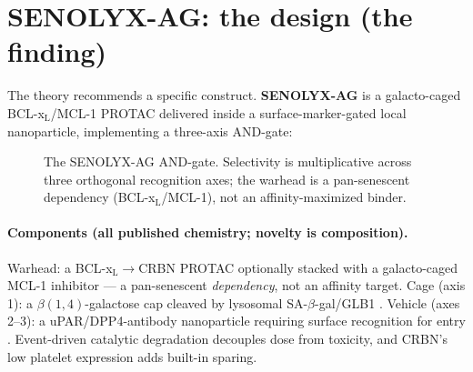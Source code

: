 \documentclass[11pt,a4paper]{article}
\newcommand{\tierdisc}[1]{\textcolor{#1}{\rule[0.05ex]{1.0ex}{1.0ex}}}
\newcommand{\tierGreen}{\tierdisc{green!60!black}}
\newcommand{\tierRed}{\tierdisc{red!80!black}}
\begin{document}
\section{SENOLYX-AG: the design (the finding)}
\label{sec:design}

The theory recommends a specific construct. \textbf{SENOLYX-AG} is a
galacto-caged BCL-x$_{\mathrm L}$/MCL-1 PROTAC delivered inside a
surface-marker-gated local nanoparticle, implementing a three-axis AND-gate:

\begin{center}
\end{center}

\begin{figure}[t]
\centering
{}
\caption{The SENOLYX-AG AND-gate. Selectivity is multiplicative across three
orthogonal recognition axes; the warhead is a pan-senescent dependency
(BCL-x$_{\mathrm L}$/MCL-1), not an affinity-maximized binder.}
\label{fig:andgate}
\end{figure}

\paragraph{Components (all published chemistry; novelty is composition).}
Warhead: a BCL-x$_{\mathrm L}\to$CRBN PROTAC \citep{pz15227} optionally stacked
with a galacto-caged MCL-1 inhibitor \citep{kotschy2016} --- a pan-senescent
\emph{dependency}, not an affinity target. Cage (axis 1): a $\beta(1,4)$-galactose
cap cleaved by lysosomal SA-$\beta$-gal/GLB1 \citep{navgal2020}. Vehicle
(axes 2--3): a uPAR/DPP4-antibody nanoparticle requiring surface recognition for
entry \citep{amor2020,dpp4}. Event-driven catalytic degradation decouples dose
from toxicity, and CRBN's low platelet expression adds built-in sparing.
\end{document}
